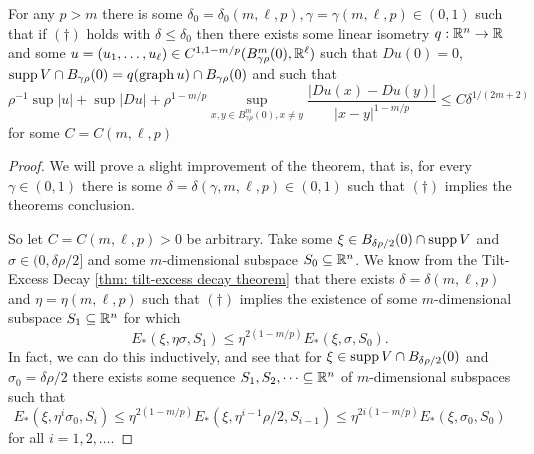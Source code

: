 \begin{theorem}\label{thm: allard}
For any $p > m$ there is some $\delta_0 = \delta_0(m, \ell, p),\gamma=\gamma(m, \ell, p) \in (0,1)$ such that if $(\dagger)$ holds with $\delta \le \delta_0$ then there exists some linear isometry $q:\mathbb{R}^n \to \mathbb{R}$ and some $u=(u_1, \dots, u_{\ell}) \in C^{1,1-m/p}(B_{\gamma\rho}^m(0), \mathbb{R}^{\ell})$ such that $Du(0)=0$, $\operatorname{supp} V \cap B_{\gamma\rho}(0)=q(\operatorname{graph} u) \cap B_{\gamma\rho}(0)$ and such that
\[
    \rho^{-1}\sup|u| + \sup|Du| + \rho^{1-m/p}\sup_{x,y \in B^m_{\gamma\rho}(0), x\neq y} \frac{|Du(x)-Du(y)|}{|x-y|^{1-m/p}} \le C\delta^{1/(2m+2)}
\]
for some $C=C(m, \ell, p)$
\end{theorem}
\begin{proof}
We will prove a slight improvement of the theorem, that is, for every $\gamma \in (0,1)$ there is some $\delta=\delta(\gamma, m, \ell, p) \in (0,1)$ such that $(\dagger)$ implies the theorems conclusion.

So let $C=C(m, \ell, p) > 0$ be arbitrary. Take some $\xi \in B_{\delta\rho/2}(0) \cap \operatorname{supp} V$ and $\sigma \in (0, \delta\rho/2]$ and some $m$-dimensional subspace $S_0 \subseteq \mathbb{R}^n$. We know from the Tilt-Excess Decay \cref{thm: tilt-excess decay theorem} that there exists $\delta = \delta(m, \ell, p)$ and $\eta=\eta(m, \ell, p)$ such that $(\dagger)$ implies the existence of some $m$-dimensional subspace $S_1 \subseteq \mathbb{R}^n$ for which
\[
    E_*(\xi, \eta\sigma, S_1) \le \eta^{2(1-m/p)}E_*(\xi, \sigma, S_0).
\]
In fact, we can do this inductively, and see that for $\xi \in \operatorname{supp} V \cap B_{\delta\rho/2}(0)$ and $\sigma_0 = \delta\rho/2$ there exists some sequence $S_1, S_2, \dots \subseteq \mathbb{R}^n$ of $m$-dimensional subspaces such that
\begin{equation}
    E_*(\xi, \eta^i\sigma_0, S_i) \le \eta^{2(1-m/p)}E_*(\xi, \eta^{i-1}\rho/2, S_{i-1}) \le \eta^{2i(1-m/p)}E_*(\xi, \sigma_0, S_0)\label{eq: allard1}
\end{equation}
for all $i = 1, 2, \dots$.


\end{proof}
